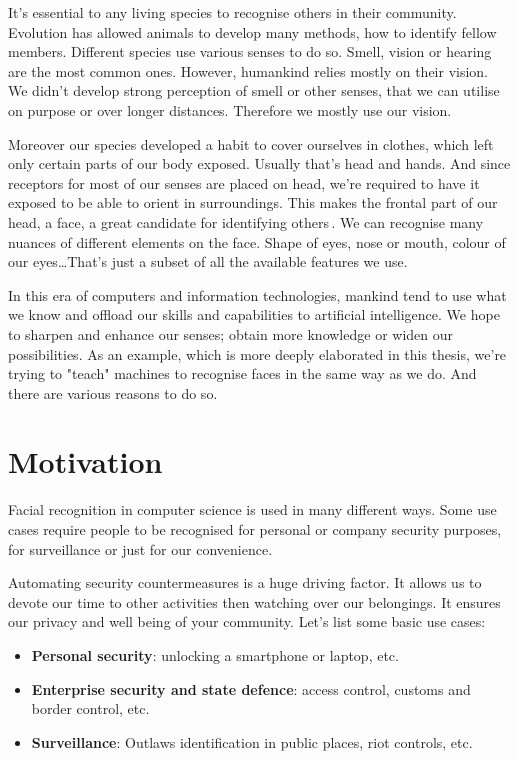 It's essential to any living species to recognise others in their community. Evolution has allowed animals to develop many methods, how to identify fellow members. Different species use various senses to do so. Smell, vision or hearing are the most common ones. However, humankind relies mostly on their vision. We didn't develop strong perception of smell or other senses, that we can utilise on purpose or over longer distances. Therefore we mostly use our vision.

Moreover our species developed a habit to cover ourselves in clothes, which left only certain parts of our body exposed. Usually that's head and hands. And since receptors for most of our senses are placed on head, we're required to have it exposed to be able to orient in surroundings. This makes the frontal part of our head, a face, a great candidate for identifying others\,\cite{biometrie1}. We can recognise many nuances of different elements on the face. Shape of eyes, nose or mouth, colour of our eyes\dots That's just a subset of all the available features we use.

In this era of computers and information technologies, mankind tend to use what we know and offload our skills and capabilities to artificial intelligence. We hope to sharpen and enhance our senses; obtain more knowledge or widen our possibilities. As an example, which is more deeply elaborated in this thesis, we're trying to "teach" machines to recognise faces in the same way as we do. And there are various reasons to do so.

\section{Motivation}
Facial recognition in computer science is used in many different ways. Some use cases require people to be recognised for personal or company security purposes, for surveillance or just for our convenience.

Automating security countermeasures is a huge driving factor. It allows us to devote our time to other activities then watching over our belongings. It ensures our privacy and well being of your community. Let's list some basic use cases:

\begin{itemize}
    \item \textbf{Personal security}: unlocking a smartphone or laptop, etc.
    \item \textbf{Enterprise security and state defence}: access control, customs and border control, etc.
    \item \textbf{Surveillance}: Outlaws identification in public places, riot controls, etc.
\end{itemize}

